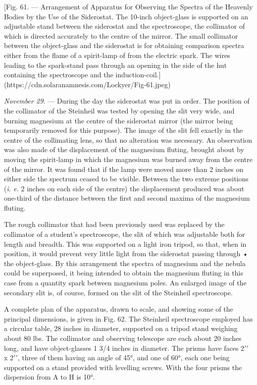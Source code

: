 \documentclass[a4paper, 12pt, oneside, polutonikogreek, english]{article}
\begin{document}
[Fig. 61. --- Arrangement of Apparatus for Observing the Spectra of the Heavenly Bodies by the Use of the Siderostat. The 10-inch object-glass is supported on an adjustable stand between the siderostat and the spectroscope, the collimator of which is directed accurately to the centre of the mirror. The small collimator between the object-glass and the siderostat is for obtaining comparison spectra either from the flame of a spirit-lamp of from the electric spark. The wires leading to the spark-stand pass through an opening in the side of the hut containing the spectroscope and the induction-coil.](https://cdn.solaranamnesis.com/Lockyer/Fig-61.jpeg)

\emph{November 29.} --- During the day the siderostat was put in order. The position of the collimator of the Steinheil was tested by opening the slit very wide, and burning magnesium at the centre of the siderostat mirror (the mirror being temporarily removed for this purpose). The image of the slit fell exactly in the centre of the collimating lens, so that no alteration was necessary. An observation was also made of the displacement of the magnesium fluting, brought about by moving the spirit-lamp in which the magnesium was burned away from the centre of the mirror. It was found that if the lamp were moved more than 2 inches on either side the spectrum ceased to be visible. Between the two extreme positions (\emph{i. e.} 2 inches on each side of the centre) the displacement produced was about one-third of the distance between the first and second maxima of the magnesium fluting.

The rough collimator that had been previously used was replaced by the collimator of a student's spectroscope, the slit of which was adjustable both for length and breadth. This was supported on a light iron tripod, so that, when in position, it would prevent very little light from the siderostat passing through • the object-glass. By this arrangement the spectra of magnesium and the nebula could be superposed, it being intended to obtain the magnesium fluting in this case from a quantity spark between magnesium poles. An enlarged image of the secondary slit is, of course, formed on the slit of the Steinheil spectroscope.

A complete plan of the apparatus, drawn to scale, and showing some of the principal dimensions, is given in Fig. 62. The Steinheil spectroscope employed has a circular table, 28 inches in diameter, supported on a tripod stand weighing about 80 lbs. The collimator and observing telescope are each about 20 inches long, and have object-glasses 1 3/4 inches in diameter. The prisms have faces 2$\prime\prime$ x 2$\prime\prime$, three of them having an angle of 45°, and one of 60°, each one being supported on a stand provided with levelling screws. With the four prisms the dispersion from A to H is 10°.
\end{document}
